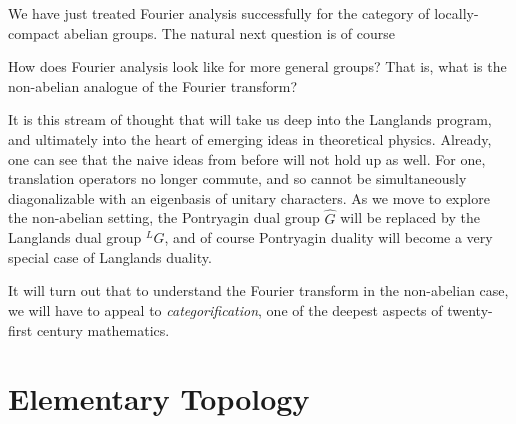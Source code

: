 		We have just treated Fourier analysis successfully for the category of locally-compact abelian groups. The natural next question is of course
		\begin{ques}
			How does Fourier analysis look like for more general groups? That is, what is the non-abelian analogue of the Fourier transform?
		\end{ques}
		It is this stream of thought that will take us deep into the Langlands program, and ultimately into the heart of emerging ideas in theoretical physics. Already, one can see that the naive ideas from before will not hold up as well. For one, translation operators no longer commute, and so cannot be simultaneously diagonalizable with an eigenbasis of unitary characters. As we move to explore the non-abelian setting, the Pontryagin dual group $\hat G$ will be replaced by the Langlands dual group $^L G$, and of course Pontryagin duality will become a very special case of Langlands duality.
		
		It will turn out that to understand the Fourier transform in the non-abelian case, we will have to appeal to \emph{categorification}, one of the deepest aspects of twenty-first century mathematics.
		
		
		
	
	\section{Elementary Topology} %
	\label{sec:elementary_topology}
	
